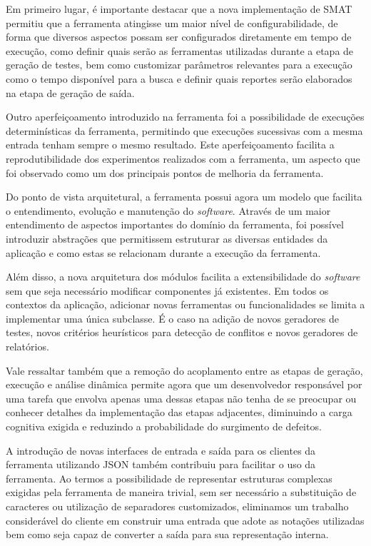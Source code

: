 \documentclass[12pt]{article}
\begin{document}
Em primeiro lugar, é importante destacar que a nova implementação de SMAT permitiu que a ferramenta atingisse um maior nível de configurabilidade, de forma que diversos aspectos possam ser configurados diretamente em tempo de execução, como definir quais serão as ferramentas utilizadas durante a etapa de geração de testes, bem como customizar parâmetros relevantes para a execução como o tempo disponível para a busca e definir quais reportes serão elaborados na etapa de geração de saída.

Outro aperfeiçoamento introduzido na ferramenta foi a possibilidade de execuções determinísticas da ferramenta, permitindo que execuções sucessivas com a mesma entrada tenham sempre o mesmo resultado. Este aperfeiçoamento facilita a reprodutibilidade dos experimentos realizados com a ferramenta, um aspecto que foi observado como um dos principais pontos de melhoria da ferramenta.

Do ponto de vista arquitetural, a ferramenta possui agora um modelo que facilita o entendimento, evolução e manutenção do \textit{software}. Através de um maior entendimento de aspectos importantes do domínio da ferramenta, foi possível introduzir abstrações que permitissem estruturar as diversas entidades da aplicação e como estas se relacionam durante a execução da ferramenta.

Além disso, a nova arquitetura dos módulos facilita a extensibilidade do \textit{software} sem que seja necessário modificar componentes já existentes. Em todos os contextos da aplicação, adicionar novas ferramentas ou funcionalidades se limita a implementar uma única subclasse. É o caso na adição de novos geradores de testes, novos critérios heurísticos para detecção de conflitos e novos geradores de relatórios.

Vale ressaltar também que a remoção do acoplamento entre as etapas de geração, execução e análise dinâmica permite agora que um desenvolvedor responsável por uma tarefa que envolva apenas uma dessas etapas não tenha de se preocupar ou conhecer detalhes da implementação das etapas adjacentes, diminuindo a carga cognitiva exigida e reduzindo a probabilidade do surgimento de defeitos.

A introdução de novas interfaces de entrada e saída para os clientes da ferramenta utilizando JSON também contribuiu para facilitar o uso da ferramenta. Ao termos a possibilidade de representar estruturas complexas exigidas pela ferramenta de maneira trivial, sem ser necessário a substituição de caracteres ou utilização de separadores customizados, eliminamos um trabalho considerável do cliente em construir uma entrada que adote as notações utilizadas bem como seja capaz de converter a saída para sua representação interna.
\end{document}
